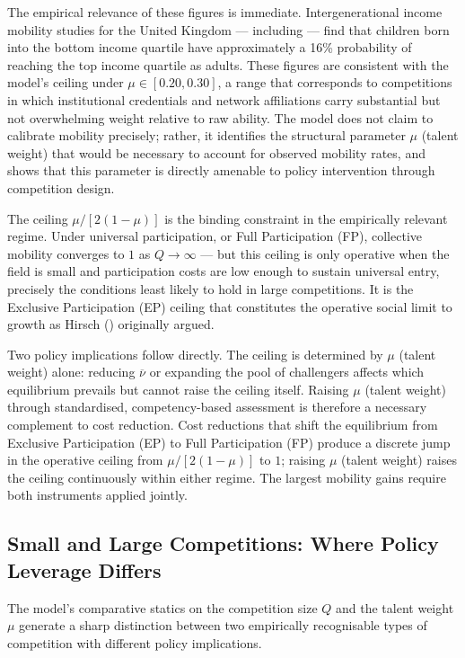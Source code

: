 \documentclass[
    oneside,
    fontsize=10pt,leqno]{article}
\begin{document}
\noindent The empirical relevance of these figures is immediate.
Intergenerational income mobility studies for the United Kingdom ---
including \citet{BlandenGreggMachin2005} --- find that children born
into the bottom income quartile have approximately a 16\% probability
of reaching the top income quartile as adults. These figures are consistent with the model's ceiling under $\mu \in [0.20, 0.30]$, a range that corresponds to competitions
in which institutional credentials and network affiliations carry
substantial but not overwhelming weight relative to raw ability.
The model does not claim to calibrate mobility precisely; rather,
it identifies the structural parameter $\mu$ (talent weight) that would be
necessary to account for observed mobility rates, and shows that
this parameter is directly amenable to policy intervention through
competition design.

The ceiling $\mu/[2(1-\mu)]$ is the binding constraint in the
empirically relevant regime. Under universal participation, or Full Participation (FP),
collective mobility converges to $1$ as $Q \to\infty$ ---
but this ceiling is only operative when the field is small and
participation costs are low enough to sustain universal entry,
precisely the conditions least likely to hold in large
competitions. It is the Exclusive Participation (EP) ceiling that constitutes the
operative social limit to growth as Hirsch
(\citeyear{HirschSocialLimits}) originally argued.

Two policy implications follow directly. The ceiling is determined
by $\mu$ (talent weight) alone: reducing $\overline{\nu}$ or expanding the pool of
challengers affects which equilibrium prevails but cannot raise the
ceiling itself. Raising $\mu$ (talent weight) through standardised, competency-based
assessment is therefore a necessary complement to cost reduction.
Cost reductions that shift the equilibrium from Exclusive Participation (EP) to Full Participation (FP)
produce a discrete jump in the operative ceiling from $\mu/[2(1-\mu)]$
to $1$; raising $\mu$ (talent weight) raises the ceiling continuously within either
regime. The largest mobility gains require both instruments applied
jointly.

\subsection{Small and Large Competitions: Where Policy Leverage Differs}

The model's comparative statics on the competition size $Q$ and the talent weight $\mu$ generate a sharp
distinction between two empirically recognisable types of competition
with different policy implications.
\end{document}
